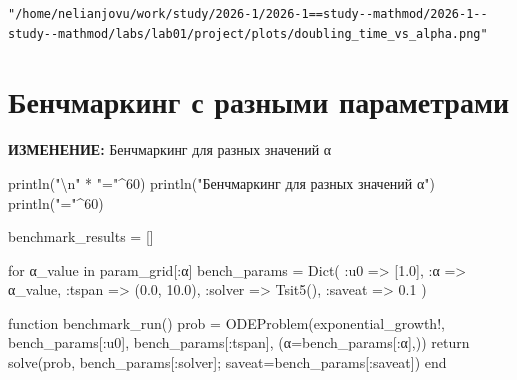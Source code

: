 \documentclass[
  12pt,
  a4paper,
  DIV=11,
  numbers=noendperiod]{scrreprt}
\newenvironment{Shaded}{\begin{snugshade}}{\end{snugshade}}
\newcommand{\ControlFlowTok}[1]{\textcolor[rgb]{0.00,0.23,0.31}{#1}}
\newcommand{\FloatTok}[1]{\textcolor[rgb]{0.68,0.00,0.00}{#1}}
\newcommand{\FunctionTok}[1]{\textcolor[rgb]{0.28,0.35,0.67}{#1}}
\newcommand{\KeywordTok}[1]{\textcolor[rgb]{0.00,0.23,0.31}{#1}}
\newcommand{\NormalTok}[1]{\textcolor[rgb]{0.00,0.23,0.31}{#1}}
\newcommand{\OperatorTok}[1]{\textcolor[rgb]{0.37,0.37,0.37}{#1}}
\newcommand{\SpecialCharTok}[1]{\textcolor[rgb]{0.37,0.37,0.37}{#1}}
\newcommand{\StringTok}[1]{\textcolor[rgb]{0.13,0.47,0.30}{#1}}
\begin{document}
\begin{verbatim}
"/home/nelianjovu/work/study/2026-1/2026-1==study--mathmod/2026-1--study--mathmod/labs/lab01/project/plots/doubling_time_vs_alpha.png"
\end{verbatim}

\section{Бенчмаркинг с разными
параметрами}\label{ux431ux435ux43dux447ux43cux430ux440ux43aux438ux43dux433-ux441-ux440ux430ux437ux43dux44bux43cux438-ux43fux430ux440ux430ux43cux435ux442ux440ux430ux43cux438}

\textbf{ИЗМЕНЕНИЕ:} Бенчмаркинг для разных значений α

\begin{Shaded}
\begin{Highlighting}[]
\FunctionTok{println}\NormalTok{(}\StringTok{"}\SpecialCharTok{\textbackslash{}n}\StringTok{"} \OperatorTok{*} \StringTok{"="}\OperatorTok{\^{}}\FloatTok{60}\NormalTok{)}
\FunctionTok{println}\NormalTok{(}\StringTok{"Бенчмаркинг для разных значений α"}\NormalTok{)}
\FunctionTok{println}\NormalTok{(}\StringTok{"="}\OperatorTok{\^{}}\FloatTok{60}\NormalTok{)}

\NormalTok{benchmark\_results }\OperatorTok{=}\NormalTok{ []}

\ControlFlowTok{for}\NormalTok{ α\_value }\KeywordTok{in}\NormalTok{ param\_grid[}\OperatorTok{:}\NormalTok{α]}
\NormalTok{    bench\_params }\OperatorTok{=} \FunctionTok{Dict}\NormalTok{(}
        \OperatorTok{:}\NormalTok{u0 }\OperatorTok{=\textgreater{}}\NormalTok{ [}\FloatTok{1.0}\NormalTok{],}
        \OperatorTok{:}\NormalTok{α }\OperatorTok{=\textgreater{}}\NormalTok{ α\_value,}
        \OperatorTok{:}\NormalTok{tspan }\OperatorTok{=\textgreater{}}\NormalTok{ (}\FloatTok{0.0}\NormalTok{, }\FloatTok{10.0}\NormalTok{),}
        \OperatorTok{:}\NormalTok{solver }\OperatorTok{=\textgreater{}} \FunctionTok{Tsit5}\NormalTok{(),}
        \OperatorTok{:}\NormalTok{saveat }\OperatorTok{=\textgreater{}} \FloatTok{0.1}
\NormalTok{    )}

    \KeywordTok{function} \FunctionTok{benchmark\_run}\NormalTok{()}
\NormalTok{        prob }\OperatorTok{=} \FunctionTok{ODEProblem}\NormalTok{(exponential\_growth!,}
\NormalTok{            bench\_params[}\OperatorTok{:}\NormalTok{u0],}
\NormalTok{            bench\_params[}\OperatorTok{:}\NormalTok{tspan],}
\NormalTok{            (α}\OperatorTok{=}\NormalTok{bench\_params[}\OperatorTok{:}\NormalTok{α],))}
        \ControlFlowTok{return} \FunctionTok{solve}\NormalTok{(prob, bench\_params[}\OperatorTok{:}\NormalTok{solver]; saveat}\OperatorTok{=}\NormalTok{bench\_params[}\OperatorTok{:}\NormalTok{saveat])}
    \ControlFlowTok{end}


\end{Highlighting}
\end{Shaded}
\end{document}
